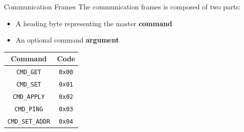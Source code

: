 \documentclass{beamer}
\begin{document}
\begin{frame}{Communication Frames}
The communication frames is composed of two parts:

\begin{itemize}
  \item A heading byte representing the master \textbf{command}
  \item An optional command \textbf{argument}
\end{itemize}

\begin{longtable}[]{@{}cc@{}}
\toprule
  Command & Code \\
\midrule
\endhead
  \texttt{CMD\_GET} & \texttt{0x00} \\
  \texttt{CMD\_SET} & \texttt{0x01} \\
  \texttt{CMD\_APPLY} & \texttt{0x02} \\
  \texttt{CMD\_PING} & \texttt{0x03} \\
  \texttt{CMD\_SET\_ADDR} & \texttt{0x04} \\
\bottomrule
\end{longtable}
\end{frame}
\end{document}
